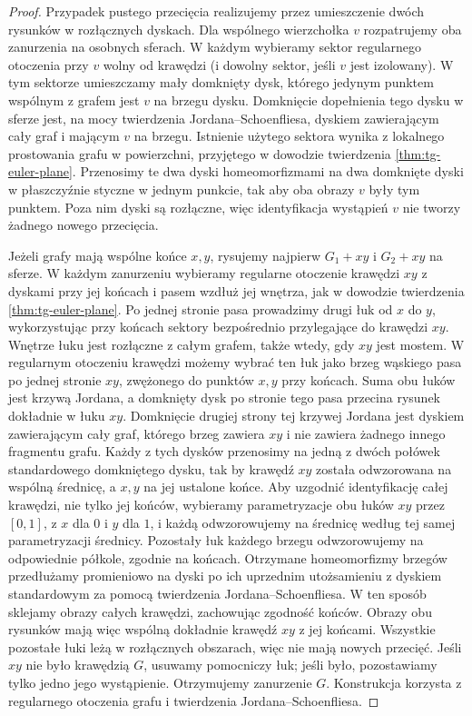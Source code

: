 \begin{proof}
Przypadek pustego przecięcia
realizujemy przez umieszczenie
dwóch rysunków w rozłącznych
dyskach. Dla wspólnego wierzchołka $v$ rozpatrujemy oba
zanurzenia na osobnych sferach. W każdym wybieramy
sektor regularnego otoczenia przy $v$ wolny od krawędzi
(i dowolny sektor, jeśli $v$ jest izolowany).
W tym sektorze umieszczamy mały domknięty dysk,
którego jedynym punktem wspólnym z grafem jest $v$
na brzegu dysku. Domknięcie dopełnienia tego dysku
w sferze jest, na mocy twierdzenia Jordana--Schoenfliesa,
dyskiem zawierającym cały graf i mającym $v$ na brzegu.
Istnienie użytego sektora wynika z lokalnego prostowania
grafu w powierzchni, przyjętego w dowodzie twierdzenia
\ref{thm:tg-euler-plane}.
Przenosimy te dwa dyski homeomorfizmami na dwa
domknięte dyski w płaszczyźnie styczne w jednym
punkcie, tak aby oba obrazy $v$ były tym punktem.
Poza nim dyski są rozłączne, więc identyfikacja
wystąpień $v$ nie tworzy żadnego nowego przecięcia.

Jeżeli grafy mają wspólne
końce $x,y$, rysujemy
najpierw $G_1+xy$
i $G_2+xy$ na sferze.
W każdym zanurzeniu wybieramy regularne otoczenie
krawędzi $xy$ z dyskami przy jej końcach i pasem
wzdłuż jej wnętrza, jak w dowodzie twierdzenia
\ref{thm:tg-euler-plane}. Po jednej stronie pasa
prowadzimy drugi łuk od $x$ do $y$, wykorzystując
przy końcach sektory bezpośrednio przylegające do
krawędzi $xy$. Wnętrze łuku jest rozłączne z całym
grafem, także wtedy, gdy $xy$ jest mostem. W regularnym
otoczeniu krawędzi możemy wybrać ten łuk jako brzeg
wąskiego pasa po jednej stronie $xy$, zwężonego
do punktów $x,y$ przy końcach. Suma obu łuków jest
krzywą Jordana, a domknięty dysk po stronie tego pasa
przecina rysunek dokładnie w łuku $xy$.
Domknięcie drugiej strony tej krzywej Jordana
jest dyskiem zawierającym cały graf, którego
brzeg zawiera $xy$ i nie zawiera żadnego innego
fragmentu grafu. Każdy z tych dysków przenosimy na jedną z dwóch
połówek standardowego domkniętego dysku, tak by
krawędź $xy$ została odwzorowana na wspólną średnicę,
a $x,y$ na jej ustalone końce. Aby uzgodnić identyfikację całej krawędzi, nie tylko
jej końców, wybieramy parametryzacje obu łuków $xy$
przez $[0,1]$, z $x$ dla $0$ i $y$ dla $1$, i każdą
odwzorowujemy na średnicę według tej samej
parametryzacji średnicy. Pozostały łuk każdego brzegu
odwzorowujemy na odpowiednie półkole, zgodnie na
końcach. Otrzymane homeomorfizmy brzegów przedłużamy
promieniowo na dyski po ich uprzednim utożsamieniu
z dyskiem standardowym za pomocą twierdzenia
Jordana--Schoenfliesa. W ten sposób sklejamy obrazy
całych krawędzi, zachowując zgodność końców.
Obrazy obu rysunków mają więc wspólną dokładnie
krawędź $xy$ z jej końcami.
Wszystkie pozostałe łuki
leżą w rozłącznych
obszarach, więc nie mają
nowych przecięć.
Jeśli $xy$ nie było
krawędzią $G$,
usuwamy pomocniczy łuk;
jeśli było, pozostawiamy
tylko jedno jego
wystąpienie.
Otrzymujemy zanurzenie $G$.
Konstrukcja korzysta z regularnego otoczenia grafu
i twierdzenia Jordana--Schoenfliesa.
\end{proof}

